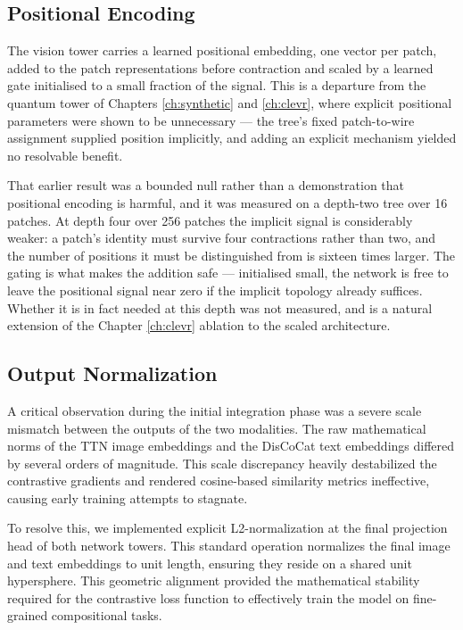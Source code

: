 \documentclass[12pt, a4paper, oneside]{report}
\begin{document}
\subsection{Positional Encoding}
The vision tower carries a learned positional embedding, one vector per patch, added to the patch representations before contraction and scaled by a learned gate initialised to a small fraction of the signal. This is a departure from the quantum tower of Chapters \ref{ch:synthetic} and \ref{ch:clevr}, where explicit positional parameters were shown to be unnecessary --- the tree's fixed patch-to-wire assignment supplied position implicitly, and adding an explicit mechanism yielded no resolvable benefit.

That earlier result was a bounded null rather than a demonstration that positional encoding is harmful, and it was measured on a depth-two tree over 16 patches. At depth four over 256 patches the implicit signal is considerably weaker: a patch's identity must survive four contractions rather than two, and the number of positions it must be distinguished from is sixteen times larger. The gating is what makes the addition safe --- initialised small, the network is free to leave the positional signal near zero if the implicit topology already suffices. Whether it is in fact needed at this depth was not measured, and is a natural extension of the Chapter \ref{ch:clevr} ablation to the scaled architecture.

\subsection{Output Normalization}
A critical observation during the initial integration phase was a severe scale mismatch between the outputs of the two modalities. The raw mathematical norms of the TTN image embeddings and the DisCoCat text embeddings differed by several orders of magnitude. This scale discrepancy heavily destabilized the contrastive gradients and rendered cosine-based similarity metrics ineffective, causing early training attempts to stagnate.

To resolve this, we implemented explicit L2-normalization at the final projection head of both network towers. This standard operation normalizes the final image and text embeddings to unit length, ensuring they reside on a shared unit hypersphere. This geometric alignment provided the mathematical stability required for the contrastive loss function to effectively train the model on fine-grained compositional tasks.
\end{document}
